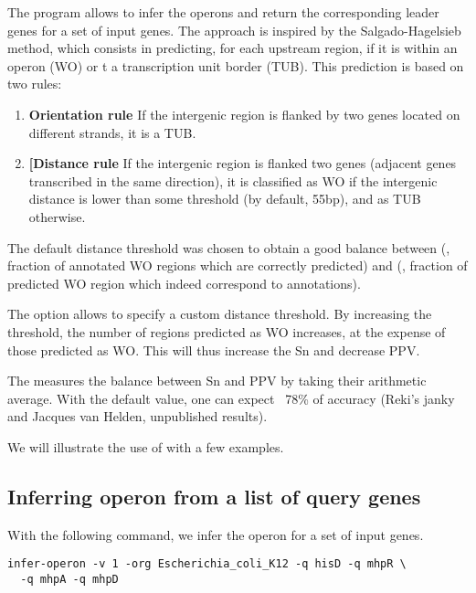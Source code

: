The program  allows to infer the operons and
return the corresponding leader genes for a set of input genes.  The
approach is inspired by the Salgado-Hagelsieb method, which consists
in predicting, for each upstream region, if it is within an operon
(WO) or t a transcription unit border (TUB). This prediction is based
on two rules:

\begin{enumerate}
\item \textbf{Orientation rule} If the intergenic region is flanked by two
  genes located on different strands, it is a TUB.

\item \textbf{[Distance rule} If the intergenic region is flanked two
   genes (adjacent genes transcribed in the same
  direction), it is classified as WO if the intergenic distance is
  lower than some threshold (by default, 55bp), and as TUB otherwise.
\end{enumerate}

The default distance threshold was chosen to obtain a good balance
between  (, fraction of annotated WO
regions which are correctly predicted) and  (, fraction of predicted WO region
which indeed correspond to annotations).

The option  allows to specify a custom distance
threshold. By increasing the threshold, the number of regions
predicted as WO increases, at the expense of those predicted as
WO. This will thus increase the Sn and decrease PPV.

The  measures the balance between Sn and PPV by
taking their arithmetic average. With the default value, one can
expect ~78\% of accuracy (Reki's janky and Jacques van Helden,
unpublished results).

We will illustrate the use of  with a few
examples.
    
\subsection{Inferring operon from a list of query genes}

With the following command, we infer the operon for a set of input
genes.

\begin{lstlisting}
infer-operon -v 1 -org Escherichia_coli_K12 -q hisD -q mhpR \
  -q mhpA -q mhpD
\end{lstlisting}

